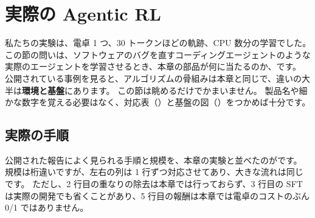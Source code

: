 \section{実際の Agentic RL}\label{sec:arl-real}

私たちの実験は、電卓 1 つ、30 トークンほどの軌跡、CPU 数分の学習でした。
この節の問いは、ソフトウェアのバグを直すコーディングエージェントのような実際のエージェントを学習させるとき、本章の部品が何に当たるのか、です。
公開されている事例を見ると、アルゴリズムの骨組みは本章と同じで、違いの大半は\textbf{環境と基盤}にあります。
この節は眺めるだけでかまいません。
製品名や細かな数字を覚える必要はなく、対応表（）と基盤の図（）をつかめば十分です。

\subsection{実際の手順}

公開された報告によく見られる手順と規模を、本章の実験と並べたのがです。
規模は桁違いですが、左右の列は 1 行ずつ対応させてあり、大きな流れは同じです。
ただし、2 行目の重なりの除去は本章では行っておらず、3 行目の SFT は実際の開発でも省くことがあり、5 行目の報酬は本章では電卓のコストのぶん 0/1 ではありません。

